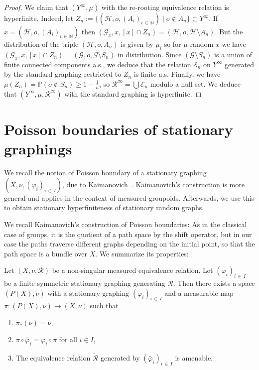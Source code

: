 \documentclass[10pt]{amsart}
\theoremstyle{definition}\newtheorem{defi}[theo]{Definition}\newtheorem{rema}[theo]{Remark}\newtheorem{exam}[theo]{Example}\newtheorem{exem}[theo]{Example}\newtheorem{nota}[theo]{Notation}
\newcommand{\bbN}{\mathbb{N}}
\newcommand{\bbP}{\mathbb{P}}
\newcommand{\calR}{\mathcal{R}}
\newcommand{\calH}{\mathcal{H}}
\newcommand{\calE}{\mathcal{E}}
\newcommand{\calG}{\mathcal{G}}
\begin{document}
\begin{proof}
We claim that $(Y^\infty,\mu)$ with the re-rooting equivalence relation is hyperfinite. Indeed, let $Z_n:=\{(\calH,o,(A_i)_{i\,\in\,\bbN}) \mid o\not\in A_n\}\subset Y^\infty$. If $x=(\calH,o,(A_i)_{i\,\in\,\bbN})$ then $(\calG_x,x,[x]\cap Z_n)=(\calH,o,\calH\setminus A_n)$. But the distribution of the triple $(\calH,o,A_n)$ is given by $\mu_i$ so for $\mu$-random $x$ we have $(\calG_x,x,[x]\cap Z_n)=(\calG,o,\calG\setminus S_n)$ in distribution. Since $(\calG\setminus S_n)$ is a union of finite connected components a.s., we deduce that the relation $\calE_n$ on $Y^\infty$ generated by the standard graphing restricted to $Z_n$ is finite a.s. Finally, we have $\mu(Z_n)=\bbP (o\not\in S_n)\geq 1-\frac{1}{n}$, so $\calR^\infty=\bigcup \calE_n$ modulo a null set. We deduce that $(Y^\infty, \mu,\calR^\infty)$ with the standard graphing is hyperfinite.
\end{proof}

\section{Poisson boundaries of stationary graphings}\label{sec:poissonSRG}

We recall the notion of Poisson boundary of a stationary graphing $(X,\nu,(\varphi_i)_{i\,\in \,I})$, due to Kaimanovich~\cite{Kai05}. Kaimanovich's construction is more general and applies in the context of measured groupoids. Afterwards, we use this to obtain stationary hyperfiniteness of stationary random graphs.

We recall Kaimanovich's construction of Poisson boundaries: As in the classical case of groups, it is the quotient of a path space by the shift operator, but in our case the paths traverse different graphs depending on the initial point, so that the path space is a bundle over $X$. We summarize its properties:


\begin{prop} \label{prop:PoissonRSG}
Let $(X,\nu,\calR)$ be a non-singular measured equivalence relation. Let $(\varphi_i)_{i\,\in\,I}$ be a finite symmetric stationary graphing generating $\calR$. Then there exists a space $(P(X),\widetilde{\nu})$ with a stationary graphing $(\widetilde{\varphi_i})_{i\,\in\,I}$ and a measurable map $\pi\colon (P(X),\widetilde{\nu})\to (X,\nu)$ such that
\begin{enumerate}
\item\label{prop4.1.1} $\pi_*(\widetilde{\nu})=\nu$,
\item\label{prop4.1.2} $\pi\circ \widetilde{\varphi_i}=\varphi_i\circ \pi$ for all $i\in I$,
\item\label{prop4.1.3} The equivalence relation $\widetilde{\calR}$ generated by $(\widetilde{\varphi_i})_{i\,\in\,I}$ is amenable.
\end{enumerate}
\end{prop}
\end{document}
